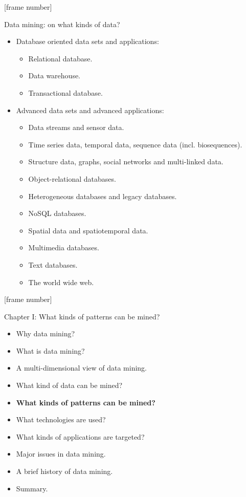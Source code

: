 \documentclass[aspectratio=169,t]{beamer}
\begin{document}
  {
    [frame number]
    \begin{frame}{Data mining: on what kinds of data?}
        \begin{itemize}
            \item Database oriented data sets and applications:
            \begin{itemize}
                \item Relational database.
                \item Data warehouse.
                \item Transactional database.
            \end{itemize}
            \item Advanced data sets and advanced applications:
            \begin{itemize}
                \item Data streams and sensor data.
                \item Time series data, temporal data, sequence data (incl. biosequences).
                \item Structure data, graphs, social networks and multi-linked data.
                \item Object-relational databases.
                \item Heterogeneous databases and legacy databases.
                \item NoSQL databases.
                \item Spatial data and spatiotemporal data.
                \item Multimedia databases.
                \item Text databases.
                \item The world wide web.
            \end{itemize}
        \end{itemize}
    \end{frame}
  }

  {
    [frame number]
    \begin{frame}{Chapter I: What kinds of patterns can be mined?}
        \begin{itemize}
            \item Why data mining?
            \item What is data mining?
            \item A multi-dimensional view of data mining.
            \item What kind of data can be mined?
            \item \textbf{What kinds of patterns can be mined?}
            \item What technologies are used?
            \item What kinds of applications are targeted?
            \item Major issues in data mining.
            \item A brief history of data mining.
            \item Summary.
        \end{itemize}
    \end{frame}
  }
\end{document}
